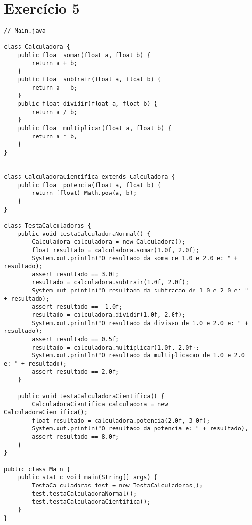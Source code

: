 \documentclass[12pt,a4paper,brazil]{article}
\begin{document}
\section*{Exercício 5}
\begin{lstlisting}
// Main.java

class Calculadora {
    public float somar(float a, float b) {
        return a + b;
    }
    public float subtrair(float a, float b) {
        return a - b;
    }
    public float dividir(float a, float b) {
        return a / b;
    }
    public float multiplicar(float a, float b) {
        return a * b;
    }
}


class CalculadoraCientifica extends Calculadora {
    public float potencia(float a, float b) {
        return (float) Math.pow(a, b);
    }
}

class TestaCalculadoras {
    public void testaCalculadoraNormal() {
        Calculadora calculadora = new Calculadora();
        float resultado = calculadora.somar(1.0f, 2.0f);
        System.out.println("O resultado da soma de 1.0 e 2.0 e: " + resultado);
        assert resultado == 3.0f;
        resultado = calculadora.subtrair(1.0f, 2.0f);
        System.out.println("O resultado da subtracao de 1.0 e 2.0 e: " + resultado);
        assert resultado == -1.0f;
        resultado = calculadora.dividir(1.0f, 2.0f);
        System.out.println("O resultado da divisao de 1.0 e 2.0 e: " + resultado);
        assert resultado == 0.5f;
        resultado = calculadora.multiplicar(1.0f, 2.0f);
        System.out.println("O resultado da multiplicacao de 1.0 e 2.0 e: " + resultado);
        assert resultado == 2.0f;
    }

    public void testaCalculadoraCientifica() {
        CalculadoraCientifica calculadora = new CalculadoraCientifica();
        float resultado = calculadora.potencia(2.0f, 3.0f);
        System.out.println("O resultado da potencia e: " + resultado);
        assert resultado == 8.0f;
    }
}

public class Main {
    public static void main(String[] args) {
        TestaCalculadoras test = new TestaCalculadoras();
        test.testaCalculadoraNormal();
        test.testaCalculadoraCientifica();
    }
}
\end{lstlisting}
\end{document}

